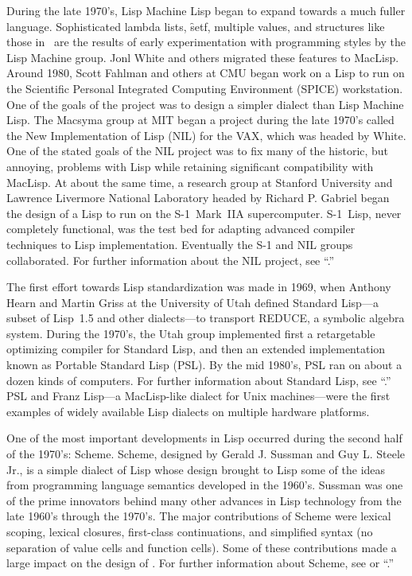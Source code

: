   During the late 1970's, Lisp Machine Lisp began to expand towards a much fuller language.  Sophisticated lambda lists,  \f{setf}, multiple values, and structures like those in \clisp\ are the results of early experimentation with programming styles by the Lisp Machine group. Jonl White and others migrated these features to MacLisp. Around 1980, Scott Fahlman and others at CMU began work on a Lisp to run on the Scientific Personal Integrated Computing Environment (SPICE) workstation.  One of the goals of the project was to design a simpler dialect than Lisp Machine Lisp.
  The Macsyma group at MIT began a project during the late 1970's called the New Implementation of Lisp (NIL) for the VAX, which was headed by White.  One of the stated goals of the NIL project was to fix many of the historic, but annoying, problems with Lisp while retaining significant  compatibility with MacLisp.  At about the same time, a research group at Stanford University and Lawrence Livermore National Laboratory headed by Richard P. Gabriel began the design of a Lisp to run on the \hbox{S-1}~Mark~IIA supercomputer.  \hbox{S-1}~Lisp, never completely functional, was the test bed for adapting advanced compiler techniques to Lisp implementation.  Eventually the \hbox{S-1} and NIL groups collaborated. For further information about the NIL project, see ``{\NILReport}.''
 

The first effort towards Lisp standardization was made in 1969,  when Anthony Hearn and Martin Griss at the University of Utah  defined Standard Lisp---a subset of Lisp~1.5 and other dialects---to  transport REDUCE, a symbolic algebra system. During the 1970's, the Utah group implemented first a retargetable optimizing compiler for Standard Lisp, and then an extended implementation known as Portable Standard Lisp (PSL). By the mid 1980's, PSL ran on about a dozen kinds of computers. For further information about Standard Lisp, see ``{\StandardLispReport}.''
  PSL and Franz Lisp---a MacLisp-like dialect for Unix machines---were  the first examples of widely available Lisp dialects on multiple  hardware platforms. 

One of the most important developments in Lisp occurred during the second half of the 1970's: Scheme. Scheme, designed by Gerald J. Sussman and Guy L. Steele Jr., is a simple dialect of Lisp whose design brought to Lisp some of the ideas from programming language semantics developed in the 1960's.  Sussman was one of the prime innovators behind many other advances in Lisp technology from the late 1960's through the 1970's. The major contributions of Scheme were lexical scoping, lexical closures, first-class continuations, and simplified syntax (no separation of value cells and function cells). Some of these contributions made a large impact on the design of \clisp. For further information about Scheme, see {\IEEEScheme} or ``{\RevisedCubedScheme}.''

